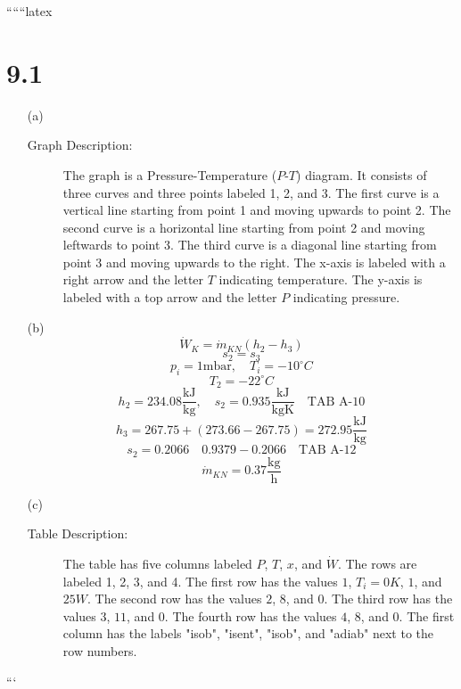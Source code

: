
``````latex


\section*{9.1}

\begin{itemize}
    \item[(a)] 
    \begin{description}
        \item[Graph Description:] The graph is a Pressure-Temperature ($P$-$T$) diagram. It consists of three curves and three points labeled 1, 2, and 3. The first curve is a vertical line starting from point 1 and moving upwards to point 2. The second curve is a horizontal line starting from point 2 and moving leftwards to point 3. The third curve is a diagonal line starting from point 3 and moving upwards to the right. The x-axis is labeled with a right arrow and the letter $T$ indicating temperature. The y-axis is labeled with a top arrow and the letter $P$ indicating pressure.
    \end{description}
    
    \item[(b)] 
    \[
    \dot{W}_K = \dot{m}_{KN} (h_2 - h_3)
    \]
    \[
    s_2 = s_3
    \]
    \[
    p_i = 1 \text{mbar}, \quad T_i = -10^\circ C
    \]
    \[
    T_2 = -22^\circ C
    \]
    \[
    h_2 = 234.08 \frac{\text{kJ}}{\text{kg}}, \quad s_2 = 0.935 \frac{\text{kJ}}{\text{kgK}} \quad \text{TAB A-10}
    \]
    \[
    h_3 = 267.75 + (273.66 - 267.75) = 272.95 \frac{\text{kJ}}{\text{kg}}
    \]
    \[
    s_2 = 0.2066 \quad 0.9379 - 0.2066 \quad \text{TAB A-12}
    \]
    \[
    \dot{m}_{KN} = 0.37 \frac{\text{kg}}{\text{h}}
    \]
    
    \item[(c)] 
    \begin{description}
        \item[Table Description:] The table has five columns labeled $P$, $T$, $x$, and $\dot{W}$. The rows are labeled 1, 2, 3, and 4. The first row has the values $1$, $T_i = 0K$, $1$, and $25W$. The second row has the values $2$, $8$, and $0$. The third row has the values $3$, $11$, and $0$. The fourth row has the values $4$, $8$, and $0$. The first column has the labels "isob", "isent", "isob", and "adiab" next to the row numbers.
    \end{description}
    
\end{itemize}

```